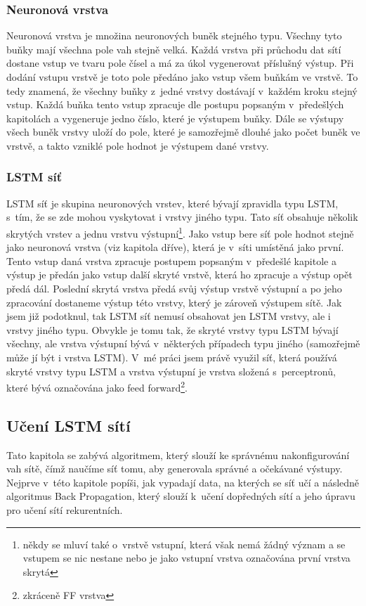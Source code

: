\documentclass[a4paper]{article}
\begin{document}
\subsubsection{Neuronová vrstva}
Neuronová vrstva je množina neuronových buněk stejného typu. Všechny tyto buňky mají všechna pole vah stejně velká. Každá vrstva při průchodu dat sítí dostane vstup ve tvaru pole čísel a má za úkol vygenerovat příslušný výstup. Při dodání vstupu vrstvě je toto pole předáno jako vstup všem buňkám ve vrstvě. To tedy znamená, že všechny buňky z~jedné vrstvy dostávají v~každém kroku stejný vstup. Každá buňka tento vstup zpracuje dle postupu popsaným v~předešlých kapitolách a vygeneruje jedno číslo, které je výstupem buňky. Dále se výstupy všech buněk vrstvy uloží do pole, které je samozřejmě dlouhé jako počet buněk ve vrstvě, a takto vzniklé pole hodnot je výstupem dané vrstvy.  
\subsubsection{LSTM síť}
LSTM síť je skupina neuronových vrstev, které bývají zpravidla typu LSTM, s~tím, že se zde mohou vyskytovat i vrstvy jiného typu. Tato síť obsahuje několik skrytých vrstev a jednu vrstvu výstupní\footnote{někdy se mluví také o~vrstvě vstupní, která však nemá žádný význam a se vstupem se nic nestane nebo je jako vstupní vrstva označována první vrstva skrytá}. Jako vstup bere síť pole hodnot stejně jako neuronová vrstva (viz kapitola dříve), která je v~síti umístěná jako první. Tento vstup daná vrstva zpracuje postupem popsaným v~předešlé kapitole a výstup je předán jako vstup další skryté vrstvě, která ho zpracuje a výstup opět předá dál. Poslední skrytá vrstva předá svůj výstup vrstvě výstupní a po jeho zpracování dostaneme výstup této vrstvy, který je zároveň výstupem sítě. Jak jsem již podotknul, tak LSTM síť nemusí obsahovat jen LSTM vrstvy, ale i vrstvy jiného typu. Obvykle je tomu tak, že skryté vrstvy typu LSTM bývají všechny, ale vrstva výstupní bývá v~některých případech typu jiného (samozřejmě může jí být i vrstva LSTM). V~mé práci jsem právě využil síť, která používá skryté vrstvy typu LSTM a vrstva výstupní je vrstva složená s~perceptronů, které bývá označována jako feed forward\footnote{zkráceně FF vrstva}.
\subsection{Učení LSTM sítí}
Tato kapitola se zabývá algoritmem, který slouží ke správnému nakonfigurování vah sítě, čímž naučíme síť tomu, aby generovala správné a očekávané výstupy. Nejprve v~této kapitole popíši, jak vypadají data, na kterých se síť učí a následně algoritmus Back Propagation, který slouží k~učení dopředných sítí a jeho úpravu pro učení sítí rekurentních.
\end{document}
